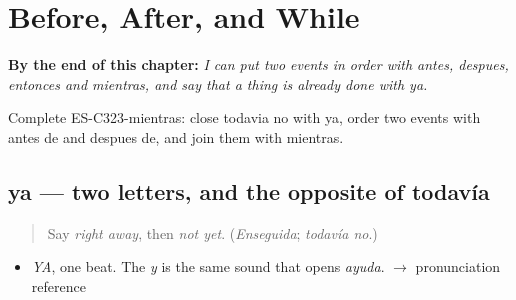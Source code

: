 
\chapter{Before, After, and While}
\label{ch:antes-y-despues}

\begin{chapteropening}
\textbf{By the end of this chapter:} \emph{I can put two events in order with antes, despues, entonces and mientras, and say that a thing is already done with ya.}

Complete ES-C323-mientras: close todavia no with ya, order two events with antes de and despues de, and join them with mientras.
\end{chapteropening}

\section[ya]{ya — two letters, and the opposite of todavía}

\label{lesson:ES-C323-ya}



\begin{quote}
Say \emph{right away}, then \emph{not yet}. (\emph{Enseguida}; \emph{todavía no}.)
\end{quote}

\begin{sounds}
\begin{itemize}
\raggedright
  \item \emph{YA}, one beat. The \emph{y} is the same sound that opens \emph{ayuda}. $\to$ pronunciation reference
\end{itemize}
\end{sounds}

